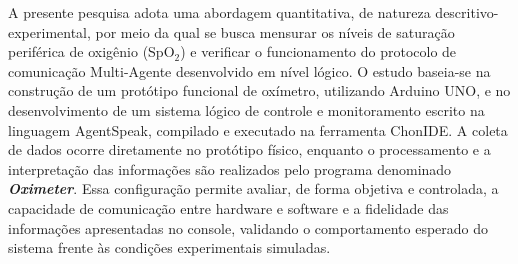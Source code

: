 

A presente pesquisa adota uma abordagem quantitativa, de natureza descritivo-experimental, por meio da qual se busca mensurar os níveis de saturação periférica de oxigênio (SpO$_2$) e verificar o funcionamento do protocolo de comunicação Multi-Agente desenvolvido em nível lógico. O estudo baseia-se na construção de um protótipo funcional de oxímetro, utilizando Arduino UNO, e no desenvolvimento de um sistema lógico de controle e monitoramento escrito na linguagem AgentSpeak, compilado e executado na ferramenta ChonIDE. A coleta de dados ocorre diretamente no protótipo físico, enquanto o processamento e a interpretação das informações são realizados pelo programa denominado \textit{\textbf{Oximeter}}. Essa configuração permite avaliar, de forma objetiva e controlada, a capacidade de comunicação entre hardware e software e a fidelidade das informações apresentadas no console, validando o comportamento esperado do sistema frente às condições experimentais simuladas.